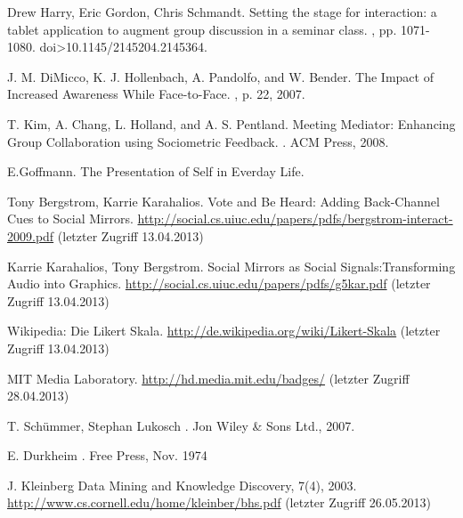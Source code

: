 \documentclass{seminarvorlage}
\begin{document}
\begin{thebibliography}{[9]}

Drew Harry, Eric Gordon, Chris Schmandt.
\newblock Setting the stage for interaction: a tablet application to augment group discussion in a seminar class. 
, pp. 1071-1080. doi>10.1145/2145204.2145364. 

J. M. DiMicco, K. J. Hollenbach, A. Pandolfo, and W. Bender.
\newblock The Impact of Increased Awareness While Face-to-Face.
, p. 22, 2007.

T. Kim, A. Chang, L. Holland, and A. S. Pentland.
\newblock Meeting Mediator: Enhancing Group Collaboration using Sociometric Feedback. 
. ACM Press, 2008.

E.Goffmann.
\newblock The Presentation of Self in Everday Life.

Tony Bergstrom, Karrie Karahalios. 
\newblock Vote and Be Heard: Adding Back-Channel Cues to Social Mirrors.
 \url {http://social.cs.uiuc.edu/papers/pdfs/bergstrom-interact-2009.pdf} (letzter Zugriff 13.04.2013)

Karrie Karahalios, Tony Bergstrom. 
\newblock Social Mirrors as Social Signals:Transforming Audio into Graphics.
 \url {http://social.cs.uiuc.edu/papers/pdfs/g5kar.pdf} (letzter Zugriff 13.04.2013)

Wikipedia: Die Likert Skala.
\newblock \url {http://de.wikipedia.org/wiki/Likert-Skala} (letzter Zugriff 13.04.2013)

 MIT Media Laboratory. 
\newblock \url {http://hd.media.mit.edu/badges/} (letzter Zugriff 28.04.2013)

T. Schümmer, Stephan Lukosch
. Jon Wiley \& Sons Ltd., 2007.

E. Durkheim
. Free Press, Nov. 1974

J. Kleinberg Data Mining and Knowledge Discovery, 7(4),
2003.
\newblock \url {http://www.cs.cornell.edu/home/kleinber/bhs.pdf} (letzter Zugriff 26.05.2013)


\end{thebibliography}
\end{document}
